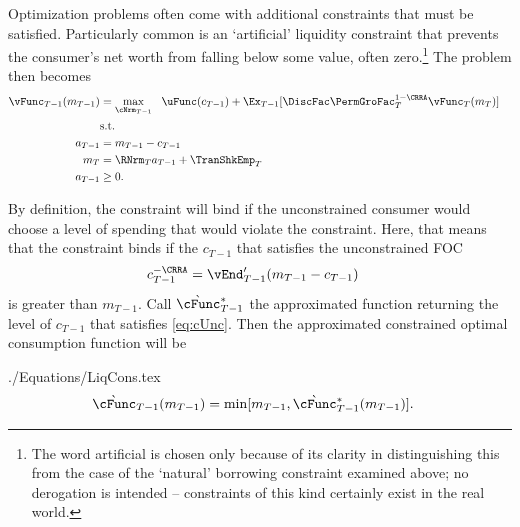 \documentclass[titlepage, headings=optiontotocandhead]{\econtex}
\begin{document}
Optimization problems often come with additional constraints that must
be satisfied.  Particularly common is an `artificial' liquidity constraint that
prevents the consumer's net worth from falling below some value, often
zero.\footnote{The word artificial is chosen only because of its clarity in distinguishing
  this from the case of the `natural' borrowing constraint examined above; no derogation is
  intended -- constraints of this kind certainly exist in the real world.}  The problem then becomes
\begin{equation*}\begin{gathered}\begin{aligned}
      {\vFunc}_{T-1}({m}_{T-1})  & = \max_{\cNrm_{T-1}} ~~ \uFunc({c}_{T-1}) + \Ex_{T-1} [\DiscFac \PermGroFac_{T}^{1-\CRRA}{\vFunc}_{T}({m}_{T})] \label{eq:ConstrArt}
      \\ & \mbox{s.t.}&  \nonumber
      \\ {a}_{T-1}  & = {m}_{T-1} - {c}_{T-1}
      \\ {m}_{T}  & = \RNrm_{T} {a}_{T-1} + \TranShkEmp_{T}
      \\ {a}_{T-1} & \geq 0 .
    \end{aligned}\end{gathered}\end{equation*}


By definition, the constraint will bind if the unconstrained consumer
would choose a level of spending that would violate the constraint.
Here, that means that the constraint binds if the ${c}_{T-1}$
that satisfies the unconstrained FOC
\begin{equation}\begin{gathered}\begin{aligned}
      {c}_{T-1}^{-\CRRA}  & = \vEnd_{T-1}^{\prime}({m}_{T-1}-{c}_{T-1}) \label{eq:cUnc}
    \end{aligned}\end{gathered}\end{equation}
is greater than ${m}_{T-1}$.  Call $\grave{\cFunc}^{\ast}_{T-1}$ the approximated function
returning the level of ${c}_{T-1}$ that satisfies \eqref{eq:cUnc}.
Then the approximated constrained optimal consumption function will be
\begin{verbatimwrite}{./Equations/LiqCons.tex}
  \begin{equation}\begin{gathered}\begin{aligned}
        \grave{\cFunc}_{T-1}({m}_{T-1})  & = \min[{m}_{T-1},\grave{\cFunc}^{\ast}_{T-1}({m}_{T-1})] \label{eq:LiqCons}.
      \end{aligned}\end{gathered}\end{equation}
\end{verbatimwrite}
\unskip
\end{document}
